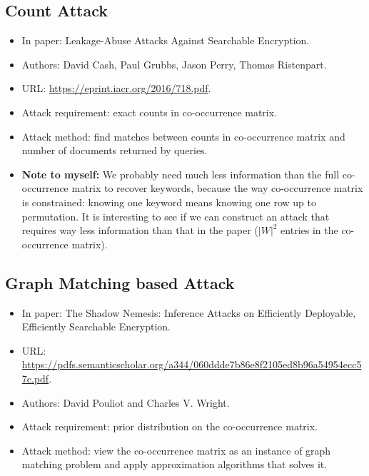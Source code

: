 \documentclass[12pt]{article}
\begin{document}
\subsection{Count Attack}
\begin{itemize}
	\item In paper: Leakage-Abuse Attacks Against Searchable Encryption.
	
	\item Authors: David Cash, Paul Grubbs, Jason Perry, Thomas Ristenpart.
	
	\item URL: \url{https://eprint.iacr.org/2016/718.pdf}.
	
	\item Attack requirement: exact counts in co-occurrence matrix.
	
	\item Attack method: find matches between counts in co-occurrence matrix and number of documents returned by queries.
	
	\item \textbf{Note to myself:} We probably need much less information than the full co-occurrence matrix to recover keywords, because the way co-occurrence matrix is constrained: knowing one keyword means knowing one row up to permutation. It is interesting to see if we can construct an attack that requires way less information than that in the paper ($|W|^2$ entries in the co-occurrence matrix).
\end{itemize}



\subsection{Graph Matching based Attack}
\begin{itemize}
	\item In paper: The Shadow Nemesis: Inference Attacks on Efficiently Deployable, Efficiently Searchable Encryption.
	
	\item URL: \url{https://pdfs.semanticscholar.org/a344/060ddde7b86e8f2105ed8b96a54954ecc57c.pdf}.
	
	\item Authors: David Pouliot and Charles V. Wright.
	
	\item Attack requirement: prior distribution on the co-occurrence matrix.
	
	\item Attack method: view the co-occurrence matrix as an instance of graph matching problem and apply approximation algorithms that solves it.
\end{itemize}
\end{document}
